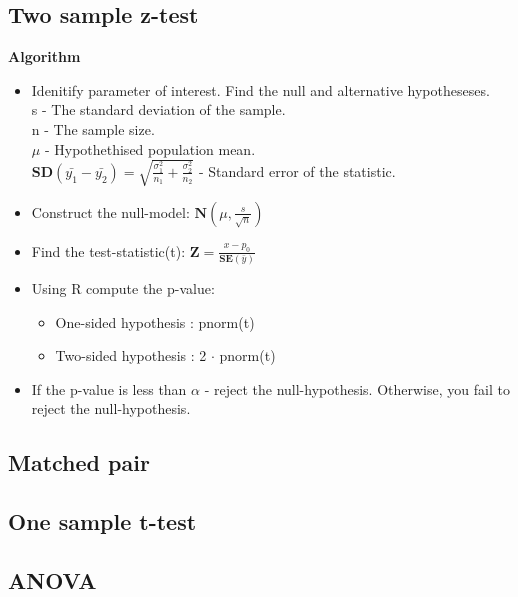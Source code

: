\documentclass{article}
\begin{document}
\subsection{Two sample z-test}
\textbf{Algorithm}
\begin{itemize}
\item Idenitify parameter of interest. Find the null and alternative hypotheseses.\\
      s - The standard deviation of the sample.\\
      n - The sample size.\\
      $\mu$ - Hypothethised population mean.\\
      $\mathbf{SD}(\bar{y_1}-\bar{y_2}) = \sqrt{\frac{\sigma_1^2}{n_1}+\frac{\sigma_2^2}{n_2}}$ - Standard error of the statistic.
\item Construct the null-model: $\mathbf{N}(\mu,\frac{s}{\sqrt{n}})$
\item Find the test-statistic(t): $\mathbf{Z} = \frac{x-p_0}{\mathbf{SE}(\bar{y})}$
\item Using R compute the p-value:
\begin{itemize}
    \item One-sided hypothesis : pnorm(t)
    \item Two-sided hypothesis : 2 $\cdot$ pnorm(t)
\end{itemize}
\item If the p-value is less than $\alpha$ - reject the null-hypothesis. 
    Otherwise, you fail to reject the null-hypothesis.
\end{itemize}
\subsection{Matched pair}
\subsection{One sample t-test}
\subsection{ANOVA}
\end{document}
